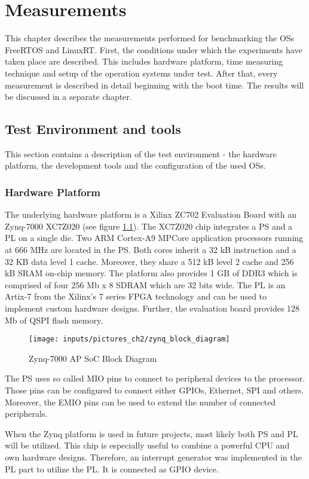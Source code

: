 \chapter{Measurements}\label{ch_measurements}
This chapter describes the measurements performed for benchmarking the \acp{OS} FreeRTOS and LinuxRT.
First, the conditions under which the experiments have taken place are described.
This includes hardware platform, time measuring technique and setup of the operation systems under test.
After that, every measurement is described in detail beginning with the boot time.
The results will be discussed in a separate chapter.

\section{Test Environment and tools}
This section contains a description of the test environment - the hardware platform, the development tools and the configuration of the used \acp{OS}.
\subsection{Hardware Platform}
The underlying hardware platform is a Xilinx ZC702 Evaluation Board \cite{xilinx:zc702_ev_board} with an Zynq-7000 XC7Z020 \cite{xilinx:zynq7000} (see figure \ref{fig_zynq_block_diagram}).
The XC7Z020 chip integrates a \ac{PS} and a \ac{PL} on a single die.
Two ARM Cortex-A9 MPCore application processors running at 666 MHz are located in the \ac{PS}.
Both cores inherit a 32 kB instruction and a 32 KB data level 1 cache.
Moreover, they share a 512 kB level 2 cache and 256 kB SRAM on-chip memory.
The platform also provides 1 GB of DDR3 which is comprised of four 256 Mb x 8 SDRAM which are 32 bits wide. 
The \ac{PL} is an Artix-7 from the Xilinx's 7 series \ac{FPGA} technology and can be used to implement custom hardware designs.
Further, the evaluation board provides 128 Mb of \ac{QSPI} flash memory.

\begin{figure}[htb]
		\begin{center}
			\texttt{[image: inputs/pictures\_ch2/zynq\_block\_diagram]}
			\caption[Zynq-7000 AP SoC Block Diagram]{Zynq-7000 AP SoC Block Diagram \cite{xilinx:zc702_ev_board}} \label{fig_zynq_block_diagram}
		\end{center}
\end{figure} 

The \ac{PS} uses so called \ac{MIO} pins to connect to peripheral devices to the processor.
Those pins can be configured to connect either \acp{GPIO}, Ethernet, \ac{SPI} and others.
Moreover, the \ac{EMIO} pins can be used to extend the number of connected peripherals.
\par
When the Zynq platform is used in future projects, most likely both \ac{PS} and \ac{PL} will be utilized.
This chip is especially useful to combine a powerful \ac{CPU} and own hardware designs.
Therefore, an interrupt generator was implemented in the \ac{PL} part to utilize the \ac{PL}.
It is connected as \ac{GPIO} device.

